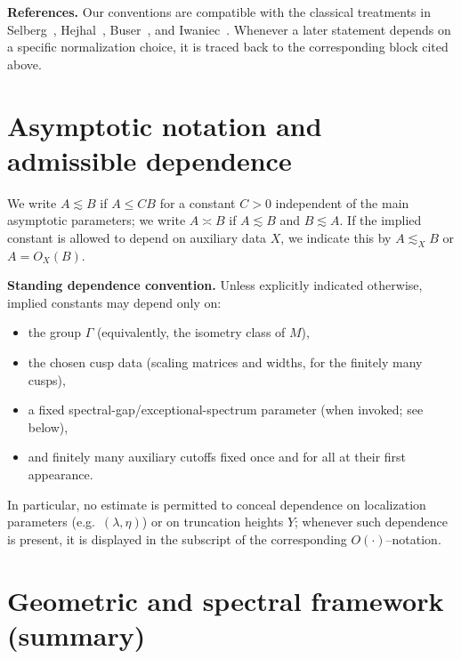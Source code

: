 \medskip
\noindent
\textbf{References.}
Our conventions are compatible with the classical treatments in
Selberg~\cite{Selberg1956}, Hejhal~\cite{Hejhal1983}, Buser~\cite{Buser1992},
and Iwaniec~\cite{Iwaniec2002}.  Whenever a later statement depends on a specific
normalization choice, it is traced back to the corresponding block cited above.

\section{Asymptotic notation and admissible dependence}\label{sec:prelim-asymp}

We write $A\lesssim B$ if $A\le C B$ for a constant $C>0$ independent of the
main asymptotic parameters; we write $A\asymp B$ if $A\lesssim B$ and $B\lesssim A$.
If the implied constant is allowed to depend on auxiliary data $X$, we indicate this
by $A\lesssim_{X} B$ or $A=O_{X}(B)$.

\medskip
\noindent
\textbf{Standing dependence convention.}
Unless explicitly indicated otherwise, implied constants may depend only on:
\begin{itemize}[leftmargin=2em]
  \item the group $\Gamma$ (equivalently, the isometry class of $M$),
  \item the chosen cusp data (scaling matrices and widths, for the finitely many cusps),
  \item a fixed spectral-gap/exceptional-spectrum parameter (when invoked; see below),
  \item and finitely many auxiliary cutoffs fixed once and for all at their first appearance.
\end{itemize}
In particular, no estimate is permitted to conceal dependence on localization parameters
(e.g.\ $(\lambda,\eta)$) or on truncation heights $Y$; whenever such dependence is present,
it is displayed in the subscript of the corresponding $O(\cdot)$--notation.

\section{Geometric and spectral framework (summary)}\label{sec:prelim-framework}

